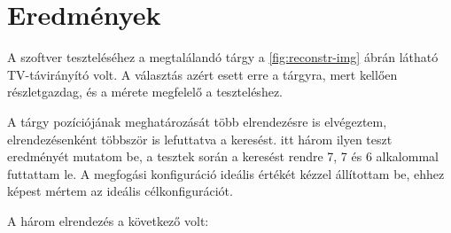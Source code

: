 \chapter{Eredmények}

A szoftver teszteléséhez a megtalálandó tárgy a \ref{fig:reconstr-img} ábrán látható TV-távirányító volt. A választás azért esett erre a tárgyra, mert kellően részletgazdag, és a mérete megfelelő a teszteléshez.

A tárgy pozíciójának meghatározását több elrendezésre is elvégeztem, elrendezésenként többször is lefuttatva a keresést. itt három ilyen teszt eredményét mutatom be, a tesztek során a keresést rendre 7, 7 és 6 alkalommal futtattam le. A megfogási konfiguráció ideális értékét kézzel állítottam be, ehhez képest mértem az ideális célkonfigurációt.

A három elrendezés a következő volt:

